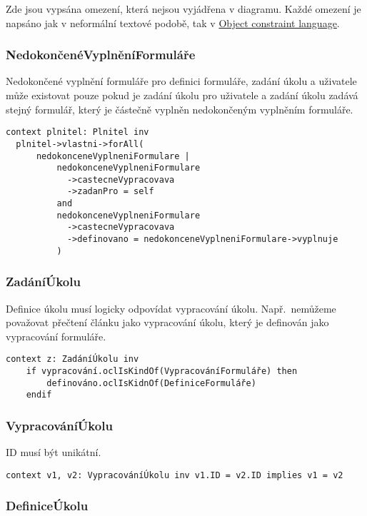 Zde jsou vypsána omezení, která nejsou vyjádřena v diagramu.
Každé omezení je napsáno jak v neformální textové podobě, tak v \href{https://www.omg.org/spec/OCL/2.4/About-OCL}{Object constraint language}.

\subsubsection{NedokončenéVyplněníFormuláře}

Nedokončené vyplnění formuláře pro definici formuláře, zadání úkolu a uživatele může existovat pouze pokud je zadání úkolu pro uživatele a zadání úkolu zadává stejný formulář, který je částečně vyplněn nedokončeným vyplněním formuláře.

\begin{verbatim}
context plnitel: Plnitel inv
  plnitel->vlastni->forAll(
      nedokonceneVyplneniFormulare |
          nedokonceneVyplneniFormulare
            ->castecneVypracovava
            ->zadanPro = self
          and
          nedokonceneVyplneniFormulare
            ->castecneVypracovava
            ->definovano = nedokonceneVyplneniFormulare->vyplnuje
          )
\end{verbatim}

\subsubsection{ZadáníÚkolu}

Definice úkolu musí logicky odpovídat vypracování úkolu.
Např.\ nemůžeme považovat přečtení článku jako vypracování úkolu, který je definován jako vypracování formuláře.

\begin{verbatim}
context z: ZadáníÚkolu inv
    if vypracování.oclIsKindOf(VypracováníFormuláře) then
        definováno.oclIsKidnOf(DefiniceFormuláře)
    endif
\end{verbatim}

\subsubsection{VypracováníÚkolu}

ID musí být unikátní.

\begin{verbatim}
context v1, v2: VypracováníÚkolu inv v1.ID = v2.ID implies v1 = v2
\end{verbatim}

\subsubsection{DefiniceÚkolu}

